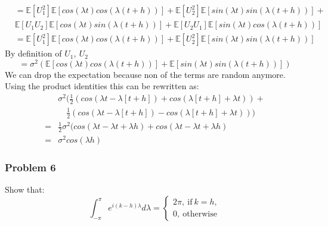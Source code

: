 \documentclass[11pt]{article}
\begin{document}
\begin{equation}
  \label{eq:20}
  \begin{split}
    &= \mathbb{E}[U_1^2] \mathbb{E} [cos(\lambda t)cos(\lambda(t+h))] + \mathbb{E}[U_2^2]\mathbb{E}[sin(\lambda t)sin(\lambda (t+h))] +\\
    &\mathbb{E}[U_1U_2] \mathbb{E}[cos(\lambda t) sin(\lambda (t+h))] + \mathbb{E}[U_2 U_1]\mathbb{E}[sin(\lambda t) cos(\lambda (t+h))]\\
    &= \mathbb{E}[U_1^2] \mathbb{E} [cos(\lambda t)cos(\lambda(t+h))] + \mathbb{E}[U_2^2]\mathbb{E}[sin(\lambda t)sin(\lambda (t+h))]
  \end{split}
\end{equation}
By definition of $U_1,\ U_2$
\begin{equation}
  \label{eq:22}
  = \sigma^2(\mathbb{E} [cos(\lambda t)cos(\lambda(t+h))] + \mathbb{E}[sin(\lambda t)sin(\lambda (t+h))])
\end{equation}
We can drop the expectation because non of the terms are random anymore.
Using the product identities this can be rewritten as:
\begin{equation}
  \label{eq:25}
  \begin{split}
    &\sigma^2(\frac{1}{2}(cos(\lambda t - \lambda[t+h]) + cos(\lambda [t+h] + \lambda t)) + \\
    &\quad \frac{1}{2} (cos(\lambda t - \lambda[t+h]) - cos(\lambda [t+h] + \lambda t)))\\
    =& \frac{1}{2}\sigma^2 (cos(\lambda t - \lambda t + \lambda h) + cos(\lambda t - \lambda t + \lambda h)\\
   =& \sigma^2cos(\lambda h)
  \end{split}
\end{equation}

\subsubsection*{Problem 6}
\label{sec:problem-6}

Show that:
\[
  \int_{-\pi}^\pi e^{i(k-h)\lambda} d \lambda = \left\{
    \begin{array}{ll}
      2\pi,\ \text{if} \ k=h,\\
      0,\ \text{otherwise}
    \end{array}
     \right.
\]
\end{document}
